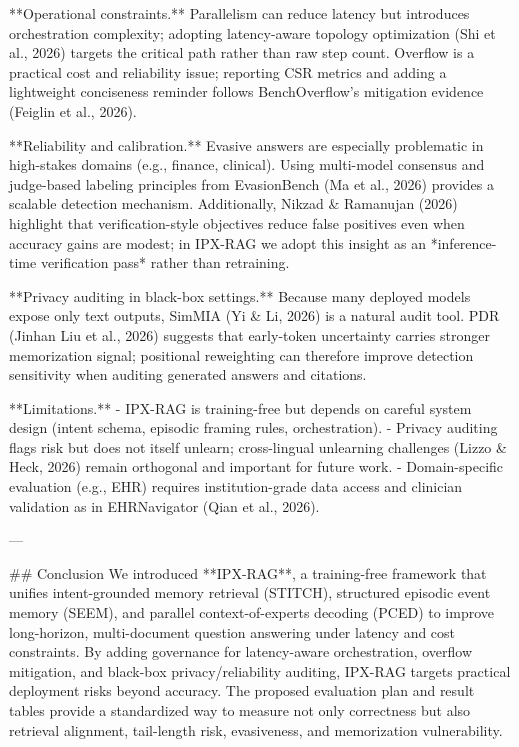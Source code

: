 **Operational constraints.** Parallelism can reduce latency but introduces orchestration complexity; adopting latency-aware topology optimization (Shi et al., 2026) targets the critical path rather than raw step count. Overflow is a practical cost and reliability issue; reporting CSR metrics and adding a lightweight conciseness reminder follows BenchOverflow’s mitigation evidence (Feiglin et al., 2026).

**Reliability and calibration.** Evasive answers are especially problematic in high-stakes domains (e.g., finance, clinical). Using multi-model consensus and judge-based labeling principles from EvasionBench (Ma et al., 2026) provides a scalable detection mechanism. Additionally, Nikzad & Ramanujan (2026) highlight that verification-style objectives reduce false positives even when accuracy gains are modest; in IPX-RAG we adopt this insight as an *inference-time verification pass* rather than retraining.

**Privacy auditing in black-box settings.** Because many deployed models expose only text outputs, SimMIA (Yi & Li, 2026) is a natural audit tool. PDR (Jinhan Liu et al., 2026) suggests that early-token uncertainty carries stronger memorization signal; positional reweighting can therefore improve detection sensitivity when auditing generated answers and citations.

**Limitations.**  
- IPX-RAG is training-free but depends on careful system design (intent schema, episodic framing rules, orchestration).  
- Privacy auditing flags risk but does not itself unlearn; cross-lingual unlearning challenges (Lizzo & Heck, 2026) remain orthogonal and important for future work.  
- Domain-specific evaluation (e.g., EHR) requires institution-grade data access and clinician validation as in EHRNavigator (Qian et al., 2026).

---

## Conclusion  
We introduced **IPX-RAG**, a training-free framework that unifies intent-grounded memory retrieval (STITCH), structured episodic event memory (SEEM), and parallel context-of-experts decoding (PCED) to improve long-horizon, multi-document question answering under latency and cost constraints. By adding governance for latency-aware orchestration, overflow mitigation, and black-box privacy/reliability auditing, IPX-RAG targets practical deployment risks beyond accuracy. The proposed evaluation plan and result tables provide a standardized way to measure not only correctness but also retrieval alignment, tail-length risk, evasiveness, and memorization vulnerability.

